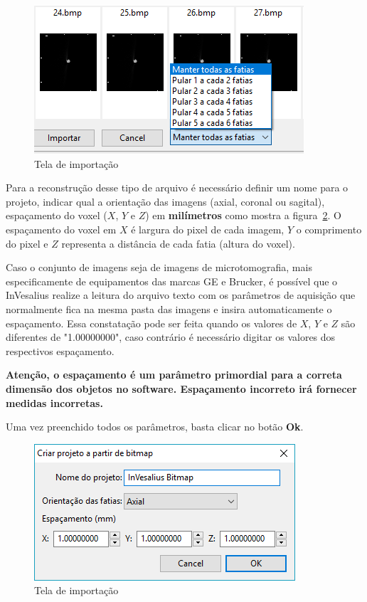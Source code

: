 \begin{figure}[!htb]
\centering
\includegraphics[scale=0.4]{../user_guide_figures/invesalius_screen/import_bmp_skip_pt.png}
\caption{Tela de importação}
\label{fig:import_bmp_skip_pt}
\end{figure}

Para a reconstrução desse tipo de arquivo é necessário definir um nome para o projeto, indicar qual a orientação das imagens (axial, coronal ou sagital), espaçamento do voxel ($X$, $Y$ e $Z$) em \textbf{milímetros} como mostra a figura~\ref{fig:import_bmp_spacing_pt}. O espaçamento do voxel em $X$ é largura do pixel de cada imagem, $Y$ o comprimento do pixel e $Z$ representa a distância de cada fatia (altura do voxel). 

Caso o conjunto de imagens seja de imagens de microtomografia, mais especificamente de equipamentos das marcas GE e Brucker, é possível que o InVesalius realize a leitura do arquivo texto com os parâmetros de aquisição que normalmente fica na mesma pasta das imagens e insira automaticamente o espaçamento. Essa constatação pode ser feita quando os valores de $X$, $Y$ e $Z$ são diferentes de "1.00000000", caso contrário é necessário digitar os valores dos respectivos espaçamento. 

\textbf{Atenção, o espaçamento é um parâmetro primordial para a correta dimensão dos objetos no software. Espaçamento incorreto irá fornecer medidas incorretas.}

Uma vez preenchido todos os parâmetros, basta clicar no botão \textbf{Ok}.

\begin{figure}[!htb]
\centering
\includegraphics[scale=0.5]{../user_guide_figures/invesalius_screen/import_bmp_spacing_pt.png}
\caption{Tela de importação}
\label{fig:import_bmp_spacing_pt}
\end{figure}

